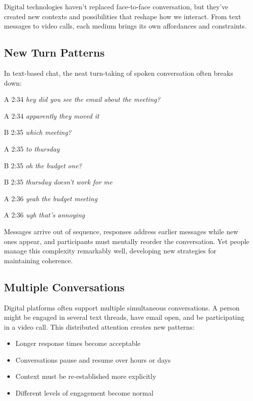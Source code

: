 Digital technologies haven't replaced face-to-face conversation, but they've created new contexts and possibilities that reshape how we interact. From text messages to video calls, each medium brings its own affordances and constraints.

\subsection{New Turn Patterns} \label{subsec:new-turns}

In text-based chat, the neat turn-taking of spoken conversation often breaks down:

\ea
\begin{dialogue}
\item[A 2:34] \textit{hey did you see the email about the meeting?}
\item[A 2:34] \textit{apparently they moved it}
\item[B 2:35] \textit{which meeting?}
\item[A 2:35] \textit{to thursday}
\item[B 2:35] \textit{oh the budget one?}
\item[B 2:35] \textit{thursday doesn't work for me}
\item[A 2:36] \textit{yeah the budget meeting}
\item[A 2:36] \textit{ugh that's annoying}
\end{dialogue}
\z
Messages arrive out of sequence, responses address earlier messages while new ones appear, and participants must mentally reorder the conversation. Yet people manage this complexity remarkably well, developing new strategies for maintaining coherence.

\subsection{Multiple Conversations} \label{subsec:multiple}

Digital platforms often support multiple simultaneous conversations. A person might be engaged in several text threads, have email open, and be participating in a video call. This distributed attention creates new patterns:

\begin{itemize}[noitemsep]
\item Longer response times become acceptable
\item Conversations pause and resume over hours or days
\item Context must be re-established more explicitly
\item Different levels of engagement become normal
\end{itemize}

